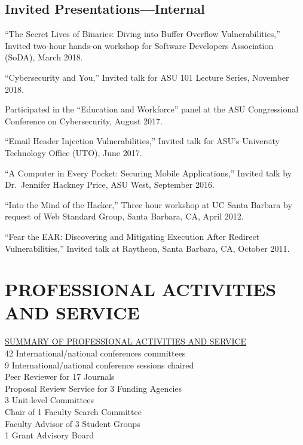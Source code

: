 \documentclass[11pt,letterpaper,sans]{moderncv}
\begin{document}
\subsection{Invited Presentations---Internal}

\begin{etaremune}

  \item ``The Secret Lives of Binaries: Diving into Buffer Overflow Vulnerabilities,'' Invited two-hour hands-on workshop for Software Developers
  Association (SoDA), March 2018.

  \item ``Cybersecurity and You,'' Invited talk for ASU 101 Lecture Series, November 2018.
  
  \item Participated in the ``Education and Workforce'' panel at the
    ASU Congressional Conference on Cybersecurity, August 2017.

  \item ``Email Header Injection Vulnerabilities,'' Invited talk for ASU's University Technology Office (UTO), June 2017.

  \item ``A Computer in Every Pocket: Securing Mobile Applications,''
    Invited talk by Dr.\ Jennifer Hackney Price, ASU West, September
    2016.

  \item ``Into the Mind of the Hacker,'' Three hour workshop at UC
    Santa Barbara by request of Web Standard Group, Santa Barbara, CA,
    April 2012.

  \item ``Fear the EAR: Discovering and Mitigating Execution After
    Redirect Vulnerabilities,'' Invited talk at Raytheon, Santa
    Barbara, CA, October 2011.

\end{etaremune}



\section{PROFESSIONAL ACTIVITIES AND SERVICE}

\begin{framed}
  \underline{SUMMARY OF PROFESSIONAL ACTIVITIES AND SERVICE} \\
  42 International/national conferences committees \\
  9 International/national conference sessions chaired \\
  Peer Reviewer for 17 Journals \\
  Proposal Review Service for 3 Funding Agencies \\
  3 Unit‐level Committees \\
  Chair of 1 Faculty Search Committee \\
  Faculty Advisor of 3 Student Groups  \\
  1 Grant Advisory Board \\
\end{framed}
\end{document}
